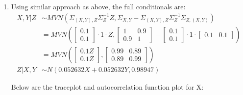 \documentclass{article}
\begin{document}
\begin{enumerate}
\item Using similar approach as above, the full conditionals are:
\begin{align*}
X,Y|Z &\sim MVN(\Sigma_{(X,Y),Z}\Sigma_Z^{-1}Z,\Sigma_{X,Y}-\Sigma_{(X,Y),Z}\Sigma_Z^{-1}\Sigma_{Z,(X,Y)}) \\
&=MVN(\begin{bmatrix} 0.1 \\ 0.1\end{bmatrix} \cdot 1 \cdot Z, 
\begin{bmatrix} 1 & 0.9 \\ 0.9 & 1 \end{bmatrix}-\begin{bmatrix} 0.1 \\ 0.1 \end{bmatrix} \cdot 1 \cdot \begin{bmatrix} 0.1 & 0.1 \end{bmatrix}) \\
&=MVN(\begin{bmatrix} 0.1Z \\ 0.1Z \end{bmatrix}, \begin{bmatrix} 0.99 & 0.89 \\ 0.89 & 0.99\end{bmatrix}) \\
Z|X,Y &\sim N(0.052632X+0.052632Y, 0.98947)
\end{align*}


Below are the traceplot and autocorrelation function plot for X:


\end{enumerate}
\end{document}
